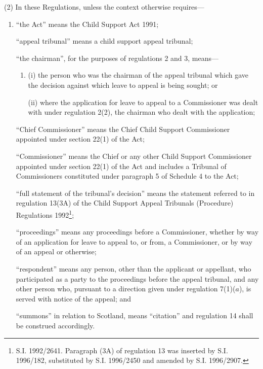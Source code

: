 \documentclass[12pt,a4paper]{article}
\begin{document}
(2) In these Regulations, unless the context otherwise requires—
\begin{enumerate}\item[]
“the Act” means the Child Support Act 1991;

“appeal tribunal” means a child support appeal tribunal;

“the chairman”, for the purposes of regulations 2 and 3, means—
\begin{enumerate}\item[]
(i) the person who was the chairman of the appeal tribunal which gave the decision against which leave to appeal is being sought; or

(ii) where the application for leave to appeal to a Commissioner was dealt with under regulation 2(2), the chairman who dealt with the application;
\end{enumerate}

“Chief Commissioner” means the Chief Child Support Commissioner appointed under section 22(1) of the Act;

“Commissioner” means the Chief or any other Child Support Commissioner appointed under section 22(1) of the Act and includes a Tribunal of Commissioners constituted under paragraph 5 of Schedule 4 to the Act;

“full statement of the tribunal’s decision” means the statement referred to in regulation 13(3A) of the Child Support Appeal Tribunals (Procedure) Regulations 1992\footnote{\frenchspacing S.I. 1992/2641. Paragraph (3A) of regulation 13 was inserted by S.I. 1996/182, substituted by S.I. 1996/2450 and amended by S.I. 1996/2907.};

\begin{sloppypar}
“proceedings” means any proceedings before a Commissioner, whether by way of an application for leave to appeal to, or from, a Commissioner, or by way of an appeal or otherwise;
\end{sloppypar}

“respondent” means any person, other than the applicant or appellant, who participated as a party to the proceedings before the appeal tribunal, and any other person who, pursuant to a direction given under regulation 7(1)($a$), is served with notice of the appeal; and

“summons” in relation to Scotland, means “citation” and regulation 14 shall be construed accordingly.
\end{enumerate}
\end{document}
